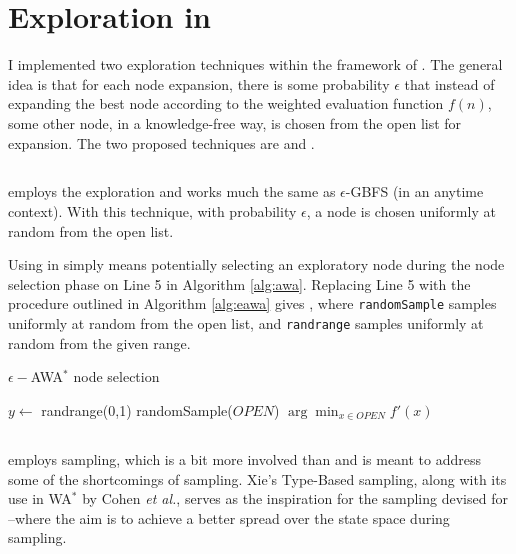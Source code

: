 \section{Exploration in \awa}
I implemented two exploration techniques within the framework of \awa. The general idea is that for each node expansion, there is some probability $\epsilon$ that instead of expanding the best node according to the weighted evaluation function $f(n)$, some other node, in a knowledge-free way, is chosen from the open list for expansion. The two proposed techniques are \egreedy and \ebgreedy.

\subsection{\eawa}
\eawa employs the \egreedy exploration and works much the same as $\epsilon$-GBFS (in an anytime context). With this technique, with probability $\epsilon$, a node is chosen uniformly at random from the open list.

Using \egreedy in \awa simply means potentially selecting an exploratory node during the node selection phase on Line 5 in Algorithm \ref{alg:awa}. Replacing Line 5 with the procedure outlined in Algorithm \ref{alg:eawa} gives \eawa, where \texttt{randomSample} samples uniformly at random from the open list, and \texttt{randrange} samples uniformly at random from the given range.

\begin{algorithm}
\caption{$\epsilon-$AWA$^*$ node selection}\label{alg:eawa}
\begin{algorithmic}
\State $y \gets $ randrange(0,1)
    \State\Return randomSample($OPEN$)
\Else{}
    \State\Return $\arg \min_{x \in OPEN} f'(x)$
\EndIf
\end{algorithmic}
\end{algorithm}

\subsection{\ebawa}
\ebawa employs \ebgreedy sampling, which is a bit more involved than \egreedy and is meant to address some of the shortcomings of \egreedy sampling. Xie's Type-Based sampling, along with its use in WA$^*$ by Cohen \textit{et al.}, serves as the inspiration for the \ebgreedy sampling devised for \ebawa--where the aim is to achieve a better spread over the state space during sampling.

